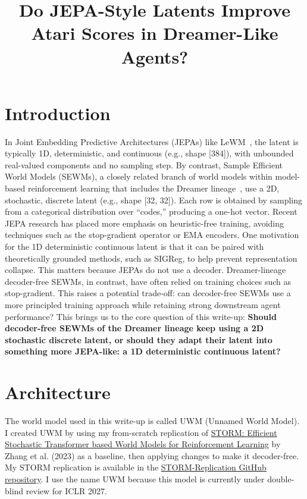 \documentclass[11pt]{article}
\title{\Large\bfseries Do JEPA-Style Latents Improve Atari Scores in Dreamer-Like Agents?}
\author{}
\date{}
\begin{document}
\maketitle

\section{Introduction}

In Joint Embedding Predictive Architectures (JEPAs) like LeWM~\cite{maes2026leworldmodelstableendtoendjointembedding}, the latent is typically 1D, deterministic, and continuous (e.g., shape [384]), with unbounded real-valued components and no sampling step. By contrast, Sample Efficient World Models (SEWMs), a closely related branch of world models within model-based reinforcement learning that includes the Dreamer lineage~\cite{hafner2020dreamcontrollearningbehaviors,hafner2022masteringataridiscreteworld,hafner2024masteringdiversedomainsworld,hafner2025trainingagentsinsidescalable}, use a 2D, stochastic, discrete latent (e.g., shape [32, 32]). Each row is obtained by sampling from a categorical distribution over ``codes,'' producing a one-hot vector.
Recent JEPA research has placed more emphasis on heuristic-free training, avoiding techniques such as the stop-gradient operator or EMA encoders. One motivation for the 1D deterministic continuous latent is that it can be paired with theoretically grounded methods, such as SIGReg, to help prevent representation collapse. This matters because JEPAs do not use a decoder. Dreamer-lineage decoder-free SEWMs, in contrast, have often relied on training choices such as stop-gradient. This raises a potential trade-off: can decoder-free SEWMs use a more principled training approach while retaining strong downstream agent performance?
This brings us to the core question of this write-up: \textbf{Should decoder-free SEWMs of the Dreamer lineage keep using a 2D stochastic discrete latent, or should they adapt their latent into something more JEPA-like: a 1D deterministic continuous latent?}

\section{Architecture}

The world model used in this write-up is called UWM (Unnamed World Model). I created UWM by using my from-scratch replication of \href{https://arxiv.org/abs/2310.09615}{STORM: Efficient Stochastic Transformer based World Models for Reinforcement Learning} by Zhang et al. (2023) as a baseline, then applying changes to make it decoder-free. My STORM replication is available in the \href{https://github.com/bcerdam/STORM-Replication}{STORM-Replication GitHub repository}. I use the name UWM because this model is currently under double-blind review for ICLR 2027.
\end{document}
